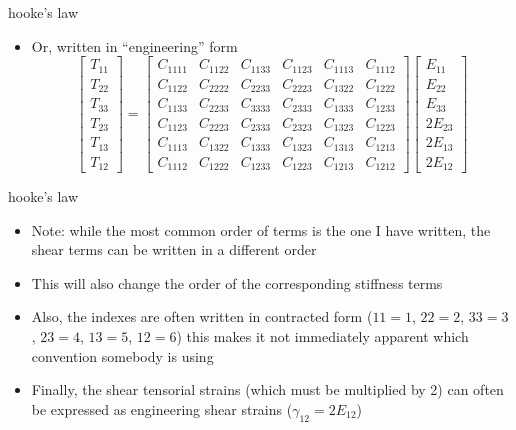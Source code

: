 \documentclass[
  letterpaper,
  ignorenonframetext,
  aspectratio=43,
  handout,
  12pt]{beamer}
\providecommand{\tightlist}{%
  \setlength{\itemsep}{0pt}\setlength{\parskip}{0pt}}
\providecommand{\tightlist}{%
\setlength{\itemsep}{0pt}\setlength{\parskip}{0pt}}
\begin{document}
\begin{frame}{hooke's law}
\protect\hypertarget{hookes-law-1}{}
\begin{itemize}
\tightlist
\item
  Or, written in ``engineering'' form \[\begin{bmatrix}
    T_{11}\\ T_{22} \\ T_{33} \\ T_{23} \\ T_{13} \\ T_{12}
    \end{bmatrix}
    = \begin{bmatrix}
    C_{1111} & C_{1122} & C_{1133} & C_{1123} & C_{1113} & C_{1112} \\
    C_{1122} & C_{2222} & C_{2233} & C_{2223} & C_{1322} & C_{1222} \\
    C_{1133} & C_{2233} & C_{3333} & C_{2333} & C_{1333} & C_{1233} \\
    C_{1123} & C_{2223} & C_{2333} & C_{2323} & C_{1323} & C_{1223} \\
    C_{1113} & C_{1322} & C_{1333} & C_{1323} & C_{1313} & C_{1213} \\
    C_{1112} & C_{1222} & C_{1233} & C_{1223} & C_{1213} & C_{1212}
    \end{bmatrix}\begin{bmatrix}
    E_{11}\\ E_{22} \\ E_{33} \\ 2E_{23} \\ 2E_{13} \\ 2E_{12}
  \end{bmatrix}\]
\end{itemize}
\end{frame}

\begin{frame}{hooke's law}
\protect\hypertarget{hookes-law-2}{}
\begin{itemize}
\tightlist
\item
  Note: while the most common order of terms is the one I have written,
  the shear terms can be written in a different order
\item
  This will also change the order of the corresponding stiffness terms
\item
  Also, the indexes are often written in contracted form (\(11 = 1\),
  \(22 = 2\), \(33 = 3\), \(23 = 4\), \(13 = 5\), \(12 = 6\)) this makes
  it not immediately apparent which convention somebody is using
\item
  Finally, the shear tensorial strains (which must be multiplied by 2)
  can often be expressed as engineering shear strains
  (\(\gamma_{12} = 2 E_{12}\))
\end{itemize}
\end{frame}
\end{document}
